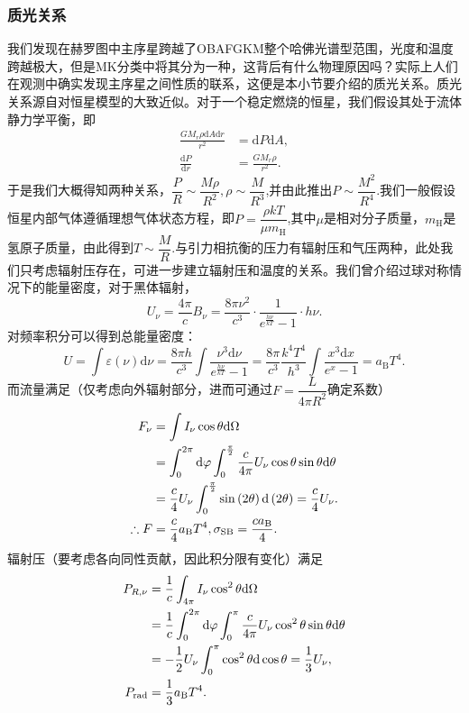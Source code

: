 \documentclass[../天体物理基础.tex]{subfiles}
\begin{document}
\subsubsection{质光关系}
我们发现在赫罗图中主序星跨越了OBAFGKM整个哈佛光谱型范围，光度和温度跨越极大，但是MK分类中将其分为一种，这背后有什么物理原因吗？实际上人们在观测中确实发现主序星之间性质的联系，这便是本小节要介绍的质光关系。质光关系源自对恒星模型的大致近似。对于一个稳定燃烧的恒星，我们假设其处于流体静力学平衡，即
\begin{align}
\frac{GM_{r}\rho\mathrm{d}A\mathrm{d}r}{r^{2}}&=\mathrm{d}P\mathrm{d}A,\\
\frac{\mathrm{d}P}{\mathrm{d}r}&=\frac{GM_{r}\rho}{r^{2}}.\label{1.4.4}
\end{align}
于是我们大概得知两种关系，$\dfrac{P}{R}\sim\dfrac{M\rho}{R^{2}},\rho\sim\dfrac{M}{R^{3}}$,并由此推出$P\sim\dfrac{M^{2}}{R^{4}}$.我们一般假设恒星内部气体遵循理想气体状态方程，即$P=\dfrac{\rho kT}{\mu m_{\mathrm{H}}}$,其中$\mu$是相对分子质量，$m_{\mathrm{H}}$是氢原子质量，由此得到$T\sim\dfrac{M}{R}$.与引力相抗衡的压力有辐射压和气压两种，此处我们只考虑辐射压存在，可进一步建立辐射压和温度的关系。我们曾介绍过球对称情况下的能量密度，对于黑体辐射，
\begin{equation}
U_{\nu}=\frac{4\pi{}}{c}B_{\nu}=\frac{8\pi\nu^{2}}{c^{3}}\cdot\frac{1}{e^{\frac{h\nu}{kT}}-1}\cdot h\nu.
\end{equation}
对频率积分可以得到总能量密度：
\begin{equation}
U=\int\varepsilon\left(\nu\right)\mathrm{d}\nu=\frac{8\pi h}{c^3}\int\frac{\nu^3\mathrm{d}\nu}{e^{\frac{h\nu}{kT}}-1}=\frac{8\pi}{c^3}\frac{k^4T^4}{h^3}\int\frac{x^3\mathrm{d}x}{e^{x}-1}=a_{\text{B}}T^4.
\end{equation}
而流量满足（仅考虑向外辐射部分，进而可通过$F=\dfrac{L}{4\pi R^{2}}$确定系数）
\begin{align}
F_\nu&=\int I_\nu\cos\theta\mathrm{d}\Omega\notag\\
&=\int_0^{2\pi}\mathrm{d}\varphi\int_0^{\frac{\pi}{2}}\frac{c}{4\pi}U_\nu\cos\theta\sin\theta\mathrm{d}\theta\notag\\
&=\frac{c}{4}U_\nu\int_0^{\frac{\pi}{2}}\sin\left(2\theta\right)\mathrm{d}\left(2\theta\right)=\frac{c}{4}U_\nu.\\
\therefore F&=\frac{c}{4}a_{\text{B}}T^4,\sigma_{\text{SB}}=\frac{ca_{\text{B}}}{4}.
\end{align}
辐射压（要考虑各向同性贡献，因此积分限有变化）满足
\begin{align}
P_{R,\nu}&=\frac{1}{c}\int_{4\pi{}}I_{\nu}\cos^{2}\theta\mathrm{d}\Omega\notag\\
&=\frac{1}{c}\int_{0}^{2\pi{}}\mathrm{d}\varphi\int_{0}^{\pi}\frac{c}{4\pi{}}U_{\nu}\cos^{2}\theta\sin\theta\mathrm{d}\theta\notag\\
&=-\frac{1}{2}U_{\nu}\int_{0}^{\pi}\cos^{2}\theta\mathrm{d}\cos\theta=\frac{1}{3}U_{\nu},\notag\\
P_{\text{rad}}&=\frac{1}{3}a_{\text{B}}T^{4}.\label{1.4.10}
\end{align}
\end{document}
